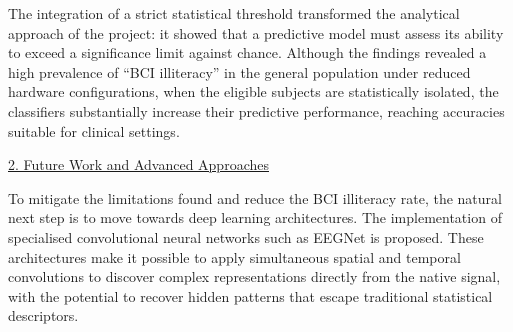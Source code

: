 \documentclass[12pt,a4paper]{article}
\newcommand{\subheading}[1]{%
  \par\noindent\underline{#1}\par\nopagebreak}
\begin{document}
The integration of a strict statistical threshold transformed the analytical approach of the
project: it showed that a predictive model must assess its ability to exceed a significance
limit against chance. Although the findings revealed a high prevalence of ``BCI illiteracy'' in
the general population under reduced hardware configurations, when the eligible subjects are
statistically isolated, the classifiers substantially increase their predictive performance,
reaching accuracies suitable for clinical settings.

\medskip
\subheading{2. Future Work and Advanced Approaches}
To mitigate the limitations found and reduce the BCI illiteracy rate, the natural next step is
to move towards deep learning architectures. The implementation of specialised convolutional
neural networks such as EEGNet is proposed. These architectures make it possible to apply
simultaneous spatial and temporal convolutions to discover complex representations directly from
the native signal, with the potential to recover hidden patterns that escape traditional
statistical descriptors.
\end{document}
